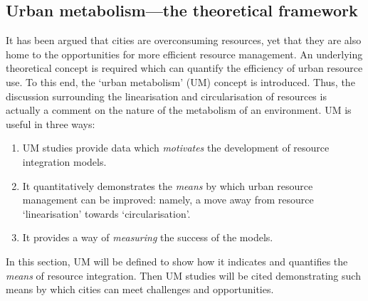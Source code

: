 \subsection{Urban metabolism---the theoretical framework}
It has been argued that cities are overconsuming resources, yet that they are also home to the opportunities for more efficient resource management. An underlying theoretical concept is required which can quantify the efficiency of urban resource use. To this end, the `urban metabolism' (UM) concept is introduced. Thus, the discussion surrounding the linearisation and circularisation of resources is actually a comment on the nature of the metabolism of an environment. UM is useful in three ways:
\begin{enumerate}
	\item UM studies provide data which \emph{motivates} the development of resource integration models. 
	\item It quantitatively demonstrates the \emph{means} by which urban resource management can be improved: namely, a move away from resource `linearisation' towards `circularisation'. 
	\item It provides a way of \emph{measuring} the success of the models. 
\end{enumerate}
In this section, UM will be defined to show how it indicates and quantifies the \emph{means} of resource integration. Then UM studies will be cited demonstrating such means by which cities can meet challenges and opportunities.

